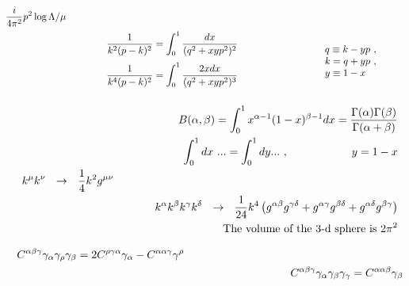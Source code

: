 \documentclass[14pt]{article}
\begin{document}
\begin{eqnarray}
    		\frac{i}{4 \pi^2} p^2 \log \Lambda/\mu   \\
\nonumber
&&
\parbox{7.0cm}
{
$$
	\frac{1}
	     {k^2 (p - k)^2}  = 
		\int_0^1
		\frac{dx}
		     {(q^2 + xy p^2)^2}~   
$$
$$
	\frac{1}
	     {k^4 (p - k)^2}  = 
		\int_0^1
		\frac{2 x dx}
		     {(q^2 + xy p^2)^3}~  
$$
}
\hspace{1.7cm}
	\parbox{3.0cm}{
		\begin{tabular}{l}
			$ q \equiv k - yp~, $ \\
	          	$ k = q + yp~,~$ \\
		      	$ y \equiv 1 - x $ \\
		\end{tabular}
			}
\end{eqnarray}


\newpage


\begin{eqnarray}
&&\nonumber
   B(\alpha,\beta) = \int_0^1 x^{\alpha-1}(1 - x)^{\beta - 1} dx = 
		\frac {\Gamma(\alpha)\Gamma(\beta)}
                      {\Gamma(\alpha + \beta)}       \\
&&\nonumber
	\int_0^1 dx ~... = \int_0^1 dy ...~,\hspace{2.0cm} y = 1 - x \\
&&\nonumber
	k^\mu k^\nu~~ \to~~ \frac{1}{4} k^2 g^{\mu\nu}  \hspace{9.0cm}\\
&&\nonumber
	k^\alpha k^\beta k^\gamma k^\delta ~~\to~~  
	\frac{1}{24}k^4 
		\left(g^{\alpha\beta}g^{\gamma\delta} +
		      g^{\alpha\gamma}g^{\beta\delta} +
                      g^{\alpha\delta}g^{\beta\gamma}\right) \\
&&\nonumber
	\text{The volume of the 3-d sphere is $ 2\pi^2 $}
\end{eqnarray}

\begin{eqnarray}
&&\nonumber
	C^{\alpha\beta\gamma}\gamma_\alpha \gamma_\rho \gamma_\beta =
	2 C^{\rho\gamma\alpha}\gamma_\alpha - 
	C^{\alpha\alpha\gamma}\gamma^\rho \hspace{7.0cm}  \\
&&\nonumber
	C^{\alpha\beta\gamma}\gamma_\alpha \gamma_\beta \gamma_\gamma =
	C^{\alpha\alpha\beta}\gamma_\beta
\end{eqnarray}
\end{document}
